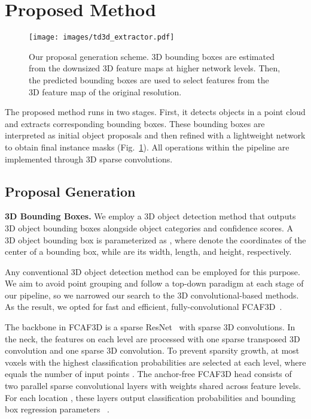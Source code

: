 \documentclass[10pt,twocolumn,letterpaper]{article}
\newcommand\inline{\noindent\textbf}
\begin{document}
\section{Proposed Method}
\label{sec:method}

\begin{figure}[h!]
    \centering
    \texttt{[image: images/td3d\_extractor.pdf]}
    \caption{Our proposal generation scheme. 3D bounding boxes are estimated from the downsized 3D feature maps at higher network levels. Then, the predicted bounding boxes are used to select features from the 3D feature map of the original resolution.}
    \label{fig:scheme}
\end{figure}

The proposed method runs in two stages. First, it detects objects in a point cloud and extracts corresponding bounding boxes. These bounding boxes are interpreted as initial object proposals and then refined with a lightweight network to obtain final instance masks (Fig.~\ref{fig:scheme}). All operations within the pipeline are implemented through 3D sparse convolutions.  

\subsection{Proposal Generation}
\label{ssec:proposal-extraction}

\inline{3D Bounding Boxes.} We employ a 3D object detection method that outputs 3D object bounding boxes alongside object categories and confidence scores. A 3D object bounding box is parameterized as , where  denote the coordinates of the center of a bounding box, while  are its width, length, and height, respectively.

Any conventional 3D object detection method can be employed for this purpose. We aim to avoid point grouping and follow a top-down paradigm at each stage of our pipeline, so we narrowed our search to the 3D convolutional-based methods. As the result, we opted for fast and efficient, fully-convolutional FCAF3D~\cite{rukhovich2022fcaf3d}.

The backbone in FCAF3D is a sparse ResNet~\cite{he2016deep} with sparse 3D convolutions. In the neck, the features on each level are processed with one sparse transposed 3D convolution and one sparse 3D convolution. To prevent sparsity growth, at most  voxels with the highest classification probabilities are selected at each level, where  equals the number of input points . The anchor-free FCAF3D head consists of two parallel sparse convolutional layers with weights shared across feature levels. For each location , these layers output classification probabilities  and bounding box regression parameters ~\cite{rukhovich2022fcaf3d}.
\end{document}
